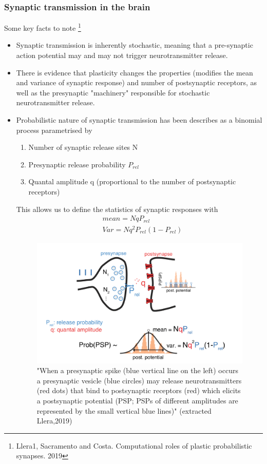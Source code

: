 \documentclass[main]{subfiles}
\begin{document}
\subsubsection{Synaptic transmission in the brain}
Some key facts to note \footnote{Llera1, Sacramento and Costa. Computational roles of plastic probabilistic synapses. 2019}
\begin{itemize}
    \item Synaptic transmission is inherently stochastic, meaning that a pre-synaptic action potential may and may not trigger neurotransmitter release.
    \item There is evidence that plasticity changes the properties (modifies the mean and variance of 
    synaptic response) and number of postsynaptic receptors, as well as the presynaptic "machinery" responsible for stochastic neurotransmitter release.
    \item Probabilistic nature of synaptic transmission has been describes as a binomial process parametrised by
        \begin{enumerate}
            \item Number of synaptic release sites N
            \item Presynaptic release probability $P_{rel}$
            \item Quantal amplitude q (proportional to the number of postsynaptic receptors)
        \end{enumerate}
    This allows us to define the statistics of synaptic responses with
    \begin{equation}
        \begin{split}
            & mean = N q P_{rel}\\
            & Var = N q^2 P_{rel} (1-P_{rel})
        \end{split}
    \end{equation}
 
    \begin{figure}[H]
    	\centering
    	\includegraphics[width=0.9\linewidth]{05_LearningAsBayesianInference/figures/synaptic_tx_model.png}
    	\caption{"When a presynaptic spike (blue vertical line on the left) occurs a presynaptic vesicle (blue circles) may release neurotransmitters (red dots) that bind to postsynaptic receptors (red) which elicits a postsynaptic potential (PSP; PSPs of different amplitudes are represented by the small vertical blue lines)" (extracted Llera,2019)} 
    	\label{fig:synaptic_tx}
    \end{figure}
    

\end{itemize}
\end{document}
